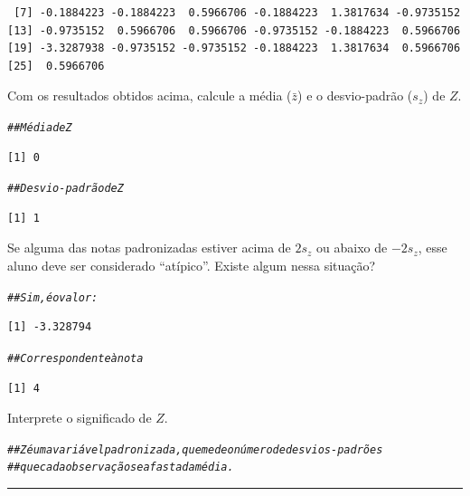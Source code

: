 \documentclass[a4paper,11pt,fleqn]{article}\usepackage[]{graphicx}\usepackage[]{color}
\makeatletter
\newcommand{\hlcom}[1]{\textcolor[rgb]{0.4,0.4,0.4}{\textit{#1}}}%
\newenvironment{kframe}{%
 \def\at@end@of@kframe{}%
 \ifinner\ifhmode%
  \def\at@end@of@kframe{\end{minipage}}%
  \begin{minipage}{\columnwidth}%
 \fi\fi%
 \def\FrameCommand##1{\hskip\@totalleftmargin \hskip-\fboxsep
 \colorbox{shadecolor}{##1}\hskip-\fboxsep
     \hskip-\linewidth \hskip-\@totalleftmargin \hskip\columnwidth}%
 \MakeFramed {\advance\hsize-\width
   \@totalleftmargin\z@ \linewidth\hsize
   \@setminipage}}%
 {\par\unskip\endMakeFramed%
 \at@end@of@kframe}
\newenvironment{knitrout}{}{} %
\theoremstyle{definition}
\makeatother
\begin{document}
\begin{compactenum}[9.]
\begin{compactenum}
\begin{knitrout}
\begin{kframe}
\begin{verbatim}
 [7] -0.1884223 -0.1884223  0.5966706 -0.1884223  1.3817634 -0.9735152
[13] -0.9735152  0.5966706  0.5966706 -0.9735152 -0.1884223  0.5966706
[19] -3.3287938 -0.9735152 -0.9735152 -0.1884223  1.3817634  0.5966706
[25]  0.5966706
\end{verbatim}
\end{kframe}
\end{knitrout}
\item Com os resultados obtidos acima, calcule a média ($\bar{z}$) e o
  desvio-padrão ($s_z$) de $Z$.
\begin{knitrout}\small
{}\color{fgcolor}\begin{kframe}
\begin{alltt}
\hlcom{## Média de Z}
\end{alltt}
\begin{verbatim}
[1] 0
\end{verbatim}
\begin{alltt}
\hlcom{## Desvio-padrão de Z}
\end{alltt}
\begin{verbatim}
[1] 1
\end{verbatim}
\end{kframe}
\end{knitrout}
\item Se alguma das notas padronizadas estiver acima de $2s_z$ ou
  abaixo de $-2s_z$, esse aluno deve ser considerado ``atípico''.
  Existe algum nessa situação?
\begin{knitrout}\small
{}\color{fgcolor}\begin{kframe}
\begin{alltt}
\hlcom{## Sim, é o valor:}
\end{alltt}
\begin{verbatim}
[1] -3.328794
\end{verbatim}
\begin{alltt}
\hlcom{## Correspondente à nota}
\end{alltt}
\begin{verbatim}
[1] 4
\end{verbatim}
\end{kframe}
\end{knitrout}
\item Interprete o significado de $Z$.
\begin{knitrout}\small
{}\color{fgcolor}\begin{kframe}
\begin{alltt}
\hlcom{## Z é uma variável padronizada, que mede o número de desvios-padrões}
\hlcom{## que cada observação se afasta da média.}
\end{alltt}
\end{kframe}
\end{knitrout}
\end{compactenum}
\end{compactenum}

\vspace{0.3cm}
\hrule
\vspace{0.3cm}
\end{document}
